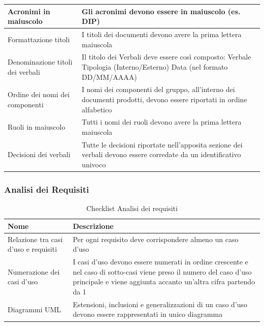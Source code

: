 \documentclass[a4paper,12pt]{article}
\begin{document}
\begin{longtable}{|M{3.5cm}|M{8.5cm}|}
                    Acronimi in maiuscolo & Gli acronimi devono essere in maiuscolo (es. DIP) \\
                    \hline

                    Formattazione titoli & I titoli dei documenti devono avere la prima lettera maiuscola \\
                    \hline

                    Denominazione titoli dei verbali & Il titolo dei Verbali deve essere così composto: Verbale Tipologia (Interno/Esterno) Data (nel formato DD/MM/AAAA) \\
                    \hline

                    Ordine dei nomi dei componenti & I nomi dei componenti del gruppo, all’interno dei documenti prodotti, devono essere riportati in ordine alfabetico \\
                    \hline

                    Ruoli in maiuscolo & Tutti i nomi dei ruoli devono avere la prima lettera maiuscola \\
                    \hline

                    Decisioni dei verbali & Tutte le decisioni riportate nell’apposita sezione dei verbali devono essere corredate da un identificativo univoco \\
                    \hline

                \end{longtable}

            \subsubsection{Analisi dei Requisiti}

                \begin{longtable}{|M{3.5cm}|M{8.5cm}|}
                    
                    \caption{Checklist Analisi dei requisiti} \\
                    \hline
                    \textbf{Nome} & \textbf{Descrizione} \\
                    \hline
                    \endhead

                    Relazione tra casi d’uso e requisiti & Per ogni requisito deve corrispondere almeno un caso d’uso \\
                    \hline

                    Numerazione dei casi d’uso & I casi d’uso devono essere numerati in ordine crescente e nel caso di sotto-casi viene preso il numero del caso d’uso principale e viene aggiunta accanto un’altra cifra partendo da 1 \\
                    \hline

                    Diagrammi UML & Estensioni, inclusioni e generalizzazioni di un caso d’uso devono essere rappresentati in unico diagramma \\
                    \hline

                \end{longtable}
\end{document}
